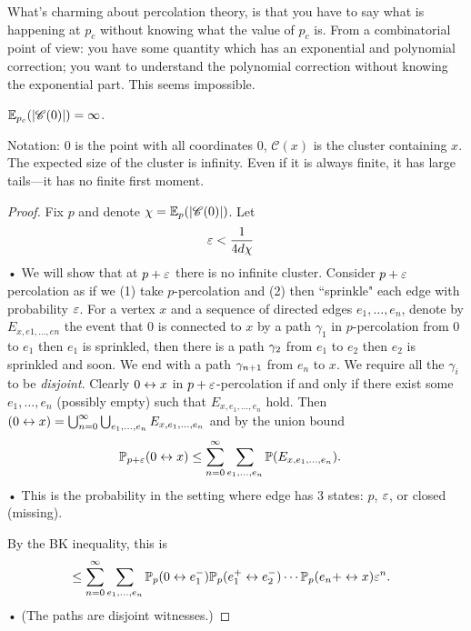 What's charming about percolation theory, is that you have to say what is happening at $p_c$ without knowing what the value of $p_c$ is.
From a combinatorial point of view: you have some quantity which has an exponential and polynomial correction; you want to understand the polynomial correction without knowing the exponential part. This seems impossible.

\begin{thm}
$\mathbb{E}_{p_c}(|\mathscr C(0)|)=\infty$.
\end{thm}
Notation: $0$ is the point with all coordinates 0, $\mathscr C(x)$ is the cluster containing $x$. The expected size of the cluster is infinity. Even if it is always finite, it has large tails---it has no finite first moment.
\begin{proof}
Fix $p$ and denote $\chi = \mathbb{E}_p(|\mathscr C(0)|)$. Let
\begin{align*}
\varepsilon&< \frac{1}{4d\chi}
\end{align*}•
We will show that at $p+\varepsilon$ there is no infinite cluster. Consider $p+\varepsilon $ percolation as if we (1) take $p$-percolation and (2) then ``sprinkle" each edge with probability $\varepsilon$. For a vertex $x$ and a sequence of directed edges $e_1,\ldots ,e_n$,
denote by $E_{x,e1,...,en}$ the event that 0 is connected to $x$ by a path $\gamma_1$ in $p$-percolation from 0 to $e_1$ then $e_1$ is sprinkled, then there is a path $\gamma_2$ from $e_1$ to $e_2$ then $e_2$  is sprinkled and soon. We end with a path $\gamma_{n+1}$ from $e_n$ to $x$. We require all the $\gamma_i$ to be \emph{disjoint}. Clearly $0\leftrightarrow x$ in $p+\varepsilon$-percolation if and only if there exist some $e_1,\ldots,e_n$ (possibly empty) such that $E_{x,e_1,\ldots, e_n}$ hold.
Then $(0\leftrightarrow x) = \bigcup_{n=0}^{\infty}\bigcup_{e_1,\ldots, e_n} E_{x,e_1,\ldots, e_n}$ and by the union bound
\begin{align*}
\mathbb{P}_{p+\varepsilon} (0\leftrightarrow x) &\le \sum_{n=0}^{\infty} \sum_{e_1,\ldots, e_n}\mathbb{P}(E_{x,e_1,\ldots, e_n}).
\end{align*}•
This is the probability in the setting where edge has 3 states: $p$, $\varepsilon$, or closed (missing).

By the BK inequality, this is
\begin{align*}
&\le \sum_{n=0}^{\infty} \sum_{e_1,\ldots, e_n} \mathbb{P}_p(0\leftrightarrow e_1^-)\mathbb{P}_p(e_1^+\leftrightarrow e_2^-)\cdots \mathbb{P}_p(e_n+\leftrightarrow x)\varepsilon^n.
\end{align*}•
(The paths are disjoint witnesses.)


\end{proof}

